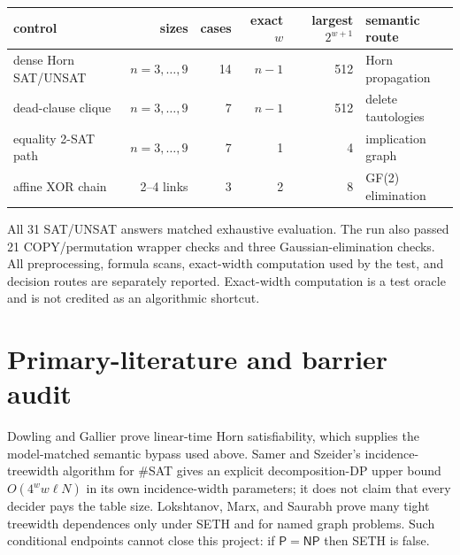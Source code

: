 \documentclass[11pt]{article}
\begin{document}
\begin{center}
\begin{tabular}{@{}lrrrrl@{}}
\toprule
control & sizes & cases & exact $w$ & largest $2^{w+1}$ & semantic route\\
\midrule
dense Horn SAT/UNSAT & $n=3,\ldots,9$ & 14 & $n-1$ & 512 & Horn propagation\\
dead-clause clique & $n=3,\ldots,9$ & 7 & $n-1$ & 512 & delete tautologies\\
equality 2-SAT path & $n=3,\ldots,9$ & 7 & 1 & 4 & implication graph\\
affine XOR chain & 2--4 links & 3 & 2 & 8 & GF(2) elimination\\
\bottomrule
\end{tabular}
\end{center}
All 31 SAT/UNSAT answers matched exhaustive evaluation.  The run also passed
21 COPY/permutation wrapper checks and three Gaussian-elimination checks.
All preprocessing, formula scans, exact-width computation used by the test,
and decision routes are separately reported.  Exact-width computation is a
test oracle and is not credited as an algorithmic shortcut.

\section{Primary-literature and barrier audit}
Dowling and Gallier prove linear-time Horn satisfiability, which supplies the
model-matched semantic bypass used above.  Samer and Szeider's
incidence-treewidth algorithm for \#SAT gives an explicit decomposition-DP
upper bound $O(4^w w\ell N)$ in its own incidence-width parameters; it does
not claim that every decider pays the table size.  Lokshtanov, Marx, and
Saurabh prove many tight treewidth dependences only under SETH and for named
graph problems.  Such conditional endpoints cannot close this project: if
$\mathsf P=\mathsf{NP}$ then SETH is false.
\end{document}
